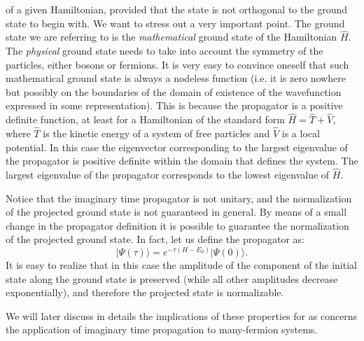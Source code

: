 of a given Hamiltonian, provided that the state is not orthogonal to the ground state to begin with.
We want to stress out a very important point. The ground state we are referring to is the {\it mathematical} ground state of the Hamiltonian $\hat{H}$. The {\it physical} ground state needs to
take into account the symmetry of the particles, either bosons or fermions.
It is very easy to convince oneself that such mathematical ground state is always a nodeless function (i.e. it is zero nowhere but possibly on the boundaries of the domain of existence of the wavefunction expressed in some representation). This is because the propagator is a positive definite function, at least for a Hamiltonian of the standard form $\hat{H}=\hat{T}+\hat{V}$, where $\hat{T}$ is the kinetic energy of a system of free particles and $\hat{V}$ is a local potential. In this case
the eigenvector corresponding to the largest eigenvalue of the propagator is positive definite within the domain that defines the system. The largest eigenvalue of the propagator corresponds to the lowest eigenvalue of $\hat{H}$.

Notice that the imaginary time propagator is not unitary, and the normalization of the projected ground state is not guaranteed in general. By means of a small change in the propagator definition it is possible to guarantee the normalization of the projected ground state. In fact, let us define the propagator as:
\begin{equation}
\vert\Psi(\tau)\rangle=e^{-\tau(H-E_0)}\vert\Psi(0)\rangle.
\end{equation}
It is easy to realize that in this case the amplitude of the component of the initial state along the ground state is preserved (while all other amplitudes decrease exponentially), and therefore the projected state is normalizable.

We will later discuss in details the implications of these properties for as concerns the application of imaginary time propagation to many-fermion systems. 
